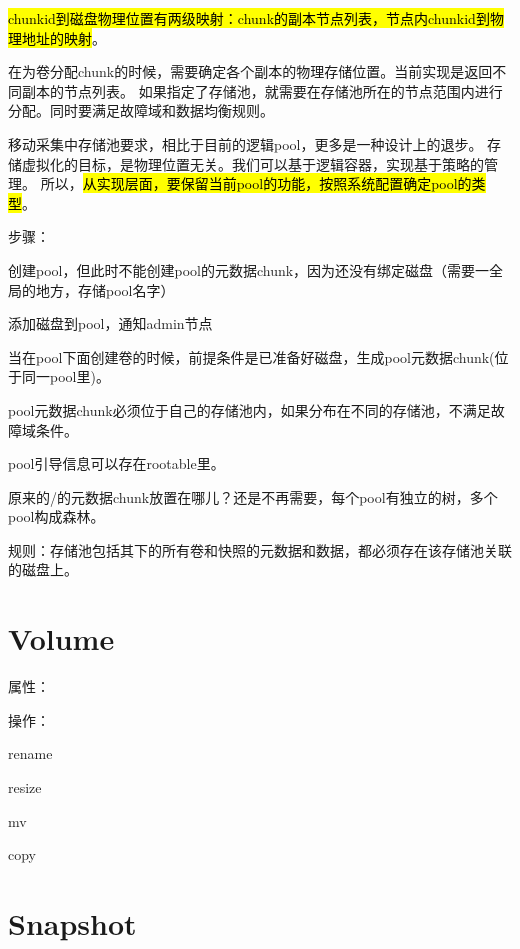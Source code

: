 \hl{chunkid到磁盘物理位置有两级映射：chunk的副本节点列表，节点内chunkid到物理地址的映射}。

在为卷分配chunk的时候，需要确定各个副本的物理存储位置。当前实现是返回不同副本的节点列表。
如果指定了存储池，就需要在存储池所在的节点范围内进行分配。同时要满足故障域和数据均衡规则。

\begin{tcolorbox}
移动采集中存储池要求，相比于目前的逻辑pool，更多是一种设计上的退步。
存储虚拟化的目标，是物理位置无关。我们可以基于逻辑容器，实现基于策略的管理。
所以，\hl{从实现层面，要保留当前pool的功能，按照系统配置确定pool的类型}。
\end{tcolorbox}


步骤：
\begin{enumbox}
\item 创建pool，但此时不能创建pool的元数据chunk，因为还没有绑定磁盘（需要一全局的地方，存储pool名字）
\item 添加磁盘到pool，通知admin节点
\item 当在pool下面创建卷的时候，前提条件是已准备好磁盘，生成pool元数据chunk(位于同一pool里)。
\end{enumbox}

pool元数据chunk必须位于自己的存储池内，如果分布在不同的存储池，不满足故障域条件。

pool引导信息可以存在rootable里。

原来的/的元数据chunk放置在哪儿？还是不再需要，每个pool有独立的树，多个pool构成森林。

规则：存储池包括其下的所有卷和快照的元数据和数据，都必须存在该存储池关联的磁盘上。

\section{Volume}

属性：

操作：
\begin{compactenum}
    \item rename
    \item resize 
    \item mv
    \item copy   %
\end{compactenum}

\section{Snapshot}

